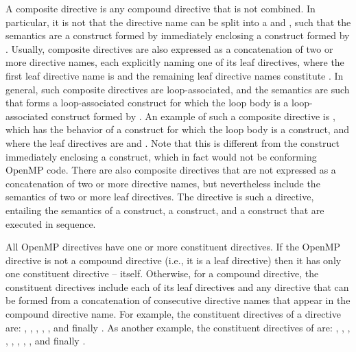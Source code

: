 A composite directive is any compound directive that is not combined. In
particular, it is not that the directive name can be split into a
 and , such that the semantics are
a construct formed by  immediately enclosing a construct
formed by . Usually, composite directives are also
expressed as a concatenation of two or more directive names, each explicitly
naming one of its leaf directives, where the first leaf directive name is
 and the remaining leaf directive names constitute
. In general, such composite directives are
loop-associated, and the semantics are such that  forms a
loop-associated construct for which the loop body is a loop-associated
construct formed by . An example of such a composite
directive is , which has the behavior of a
 construct for which the loop body is a 
construct, and where the leaf directives are  and
. Note that this is different from the  construct
immediately enclosing a  construct, which in fact would not be
conforming OpenMP code. There are also composite directives that are not
expressed as a concatenation of two or more directive names, but nevertheless
include the semantics of two or more leaf directives. The 
directive is such a directive, entailing the semantics of a
 construct, a  construct, and a
 construct that are executed in sequence.

All OpenMP directives have one or more constituent directives.
If the OpenMP directive is not a compound directive (i.e., it is a leaf
directive) then it has only one constituent directive -- itself. Otherwise, for
a compound directive, the constituent directives include each of its leaf
directives and any directive that can be formed from a concatenation of
consecutive directive names that appear in the compound directive name. For
example, the constituent directives of a  directive
are: , , , ,
, and finally . As another example,
the constituent directives of  are:
, , ,
, , , , , and finally .

